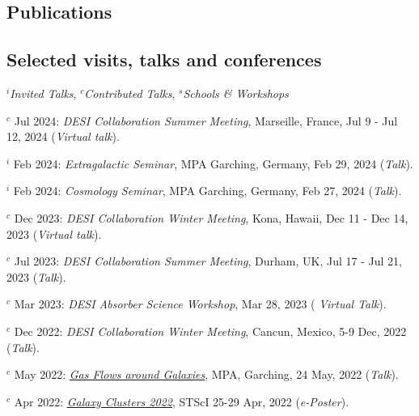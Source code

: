 \documentclass[12pt,letterpaper]{article}
\begin{document}
\ifdefined\withpubs
  \subsection{Publications}
  

\subsection{Selected visits, talks and conferences}
$^i$\emph{Invited Talks}, $^c$\emph{Contributed Talks}, $^s$\emph{Schools \& Workshops}
\begin{list}{}{\cvlist}
\item $^c$ Jul 2024:  \emph{DESI Collaboration Summer Meeting}, Marseille, France,   Jul 9 - Jul 12, 2024 (\textit{Virtual talk}).
\item $^i$ Feb 2024:  \emph{Extragalactic Seminar}, MPA Garching, Germany, Feb 29, 2024 (\textit{Talk}).
\item $^i$ Feb 2024:  \emph{Cosmology Seminar}, MPA Garching, Germany, Feb 27, 2024 (\textit{Talk}).
\item $^c$ Dec 2023:  \emph{DESI Collaboration Winter Meeting}, Kona, Hawaii, Dec 11 - Dec 14, 2023 (\textit{Virtual talk}).
\item $^c$ Jul 2023:  \emph{DESI Collaboration Summer Meeting}, Durham, UK, Jul 17 - Jul 21, 2023 (\textit{Talk}).
\item $^c$ Mar 2023:  \emph{DESI Absorber Science Workshop}, Mar 28, 2023 (\textit{ Virtual Talk}).
\item $^c$ Dec 2022:  \emph{DESI Collaboration Winter Meeting}, Cancun, Mexico, 5-9 Dec, 2022 (\textit{Talk}).
\item $^c$ May 2022:  \emph{\href{https://indico.ph.tum.de/event/7018/}{Gas Flows around Galaxies}}, MPA, Garching, 24 May, 2022 (\textit{Talk}).
\item $^c$ Apr 2022:  \emph{\href{https://www.stsci.edu/contents/events/stsci/2022/april/galaxy-clusters-2022-challenging-our-cosmological-perspectives}{Galaxy Clusters 2022}}, STScI 25-29 Apr, 2022 (\textit{e-Poster}).

\end{list}
\end{document}
